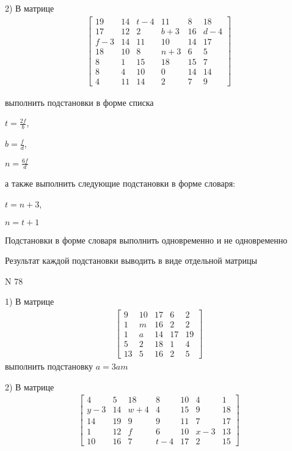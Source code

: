 \documentclass[11pt]{report}
\begin{document}
    2) В матрице
\begin{align*}
\left[\begin{matrix}19 & 14 & t - 4 & 11 & 8 & 18\\17 & 12 & 2 & b + 3 & 16 & d - 4\\f - 3 & 14 & 11 & 10 & 14 & 17\\18 & 10 & 8 & n + 3 & 6 & 5\\8 & 1 & 15 & 18 & 15 & 7\\8 & 4 & 10 & 0 & 14 & 14\\4 & 11 & 14 & 2 & 7 & 9\end{matrix}\right]
\end{align*}

выполнить подстановки в форме списка

$t=\frac{2 f}{b}$,

$b=\frac{f}{d}$,

$n=\frac{6 f}{d}$

а также выполнить следующие подстановки в форме словаря:

$t=n + 3$,

$n=t + 1$


    Подстановки в форме словаря выполнить одновременно и не одновременно


    Результат каждой подстановки выводить в виде отдельной матрицы

\newpage
N 78


    1) В матрице
\begin{align*}
\left[\begin{matrix}9 & 10 & 17 & 6 & 2\\1 & m & 16 & 2 & 2\\1 & a & 14 & 17 & 19\\5 & 2 & 18 & 1 & 4\\13 & 5 & 16 & 2 & 5\end{matrix}\right]
\end{align*}
выполнить подстановку $a=3 a m$


    2) В матрице
\begin{align*}
\left[\begin{matrix}4 & 5 & 18 & 8 & 10 & 4 & 1\\y - 3 & 14 & w + 4 & 4 & 15 & 9 & 18\\14 & 19 & 9 & 9 & 11 & 7 & 17\\1 & 12 & f & 6 & 10 & x - 3 & 13\\10 & 16 & 7 & t - 4 & 17 & 2 & 15\end{matrix}\right]
\end{align*}
\end{document}
